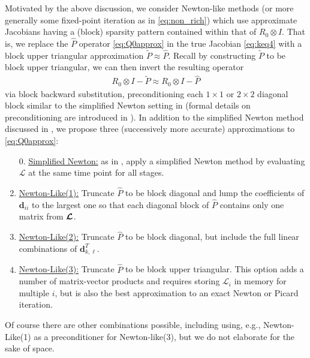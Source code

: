 \documentclass[review]{siamart}
\begin{document}
Motivated by the above discussion, we consider Newton-like methods (or more
generally some fixed-point iteration as in \eqref{eq:non_rich}) which use
approximate Jacobians having a (block) sparsity pattern contained within that of
$R_0 \otimes I$. That is, we replace the $\widehat{P}$ operator
\eqref{eq:Q0approx} in the true Jacobian \eqref{eq:keq4} with a block upper
triangular approximation $\widetilde{P} \approx \widehat{P}$. Recall by
constructing $\widetilde{P}$ to be block upper triangular, we can then invert
the resulting operator
%
\begin{align}
R_0 \otimes I -  \widetilde{P} \approx R_0 \otimes I -\widehat{P}
\end{align}
%
via block backward substitution, preconditioning each $1\times 1$
or $2\times 2$ diagonal block similar to the simplified Newton setting in
 (formal details on preconditioning are introduced
in ). In addition to the simplified Newton
method discussed in , we propose three (successively
more accurate) approximations to \eqref{eq:Q0approx}:
\vspace{1ex}
%
\begin{enumerate}
\setlength\itemsep{0.5em}
\item[0.] \underline{Simplified Newton:} as in , apply a
simplified Newton method by evaluating $\mathcal{L}$ at the same time point for
all stages.

\item \underline{Newton-Like(1):} Truncate $\widehat{P}$ to be block diagonal and
lump the coefficients of $\bm{d}_{ii}$ to the largest one so that each diagonal
block of $\widehat{P}$ contains only one matrix from $\bm{{\cal L}}$.

\item \underline{Newton-Like(2):} Truncate $\widehat{P}$ to be block diagonal,
but include the full linear combinations of $\bm{d}^T_{k,\ell}$.

\item \underline{Newton-Like(3):} Truncate $\widehat{P}$ to be block upper triangular.
This option adds a number of matrix-vector products and requires storing $\mathcal{L}_i$
in memory for multiple $i$, but is also the best approximation to an exact Newton or
Picard iteration.

\end{enumerate}
%
Of course there are other combinations possible, including using, e.g.,
Newton-Like(1) as a preconditioner for Newton-like(3), but we do not
elaborate for the sake of space.
\end{document}
